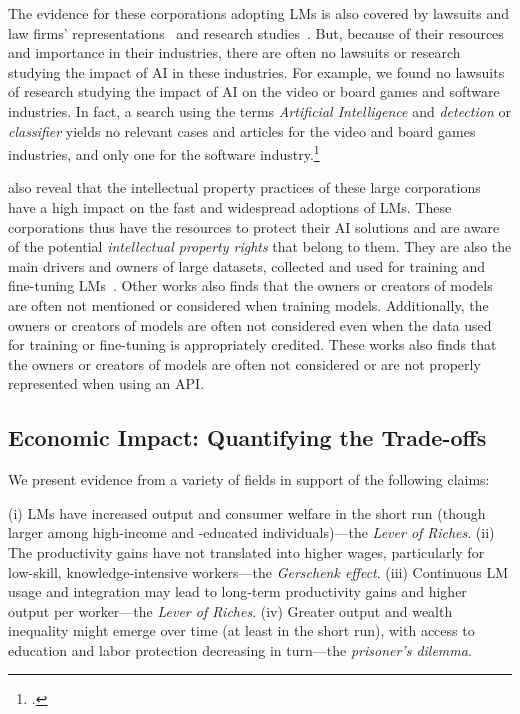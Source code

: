 \documentclass{article} %
\begin{document}
The evidence for these corporations adopting LMs is also covered by lawsuits and law firms' representations~\citep{mishcon_generative_ai_ip_tracker} and research studies~\citep{mishcon_generative_ai_ip_tracker}.
But, because of their resources and importance in their industries, there are often no lawsuits or research studying the impact of AI in these industries.
For example, we found no lawsuits of research studying the impact of AI on the video or board games and software industries.
In fact, a search using the terms \emph{Artificial Intelligence} and \emph{detection} or \emph{classifier} yields no relevant cases and articles for the video and board games industries, and only one for the software industry.\footnote{\citet{fowler2023falsepositives}.}

\citet{mishcon_generative_ai_ip_tracker} also reveal that the intellectual property practices of these large corporations have a high impact on the fast and widespread adoptions of LMs.
These corporations thus have the resources to protect their AI solutions and are aware of the potential \emph{intellectual property rights} that belong to them.
They are also the main drivers and owners of large datasets, collected and used for training and fine-tuning LMs~\citep{longpre2024large}.
Other works also finds that the owners or creators of models are often not mentioned or considered when training models.
Additionally, the owners or creators of models are often not considered even when the data used for training or fine-tuning is appropriately credited.
These works also finds that the owners or creators of models are often not considered or are not properly represented when using an API.

\subsection{Economic Impact: Quantifying the Trade-offs}
\label{EconEvidence}

We present evidence from a variety of fields in support of the following claims:

    (i) LMs have increased output and consumer welfare in the short run (though larger among high-income and -educated individuals)---the \emph{Lever of Riches}.
    (ii) The productivity gains have not translated into higher wages, particularly for low-skill, knowledge-intensive workers---the \emph{Gerschenk effect}.
    (iii) Continuous LM usage and integration may lead to long-term productivity gains and higher output per worker---the \emph{Lever of Riches}.
    (iv) Greater output and wealth inequality might emerge over time (at least in the short run), with access to education and labor protection decreasing in turn---the \emph{prisoner's dilemma}.
\end{document}
